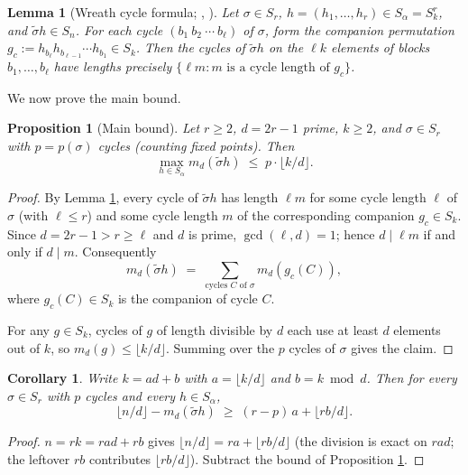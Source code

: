 \documentclass[11pt]{article}
\newtheorem{proposition}[theorem]{Proposition}
\newtheorem{corollary}[theorem]{Corollary}
\newtheorem{lemma}[theorem]{Lemma}
\theoremstyle{plain}
\theoremstyle{definition}
\theoremstyle{remark}
\begin{document}
\begin{lemma}[{Wreath cycle formula; \cite[Lem 4.5]{Clio-first-period},
\cite[Ch.~I App.~B]{Macdonald}}]
\label{lem:wreath}
Let $\sigma \in S_r$, $h = (h_1, \ldots, h_r) \in S_\alpha = S_k^r$, and
$\tilde\sigma h \in S_n$. For each cycle $(b_1\ b_2\ \cdots\ b_\ell)$ of
$\sigma$, form the companion permutation
$g_c := h_{b_\ell} h_{b_{\ell-1}} \cdots h_{b_1} \in S_k$. Then the cycles
of $\tilde\sigma h$ on the $\ell k$ elements of blocks $b_1, \ldots, b_\ell$
have lengths precisely $\{\ell m : m \text{ is a cycle length of } g_c\}$.
\end{lemma}

We now prove the main bound.

\begin{proposition}[Main bound]
\label{prop:bound}
Let $r \ge 2$, $d = 2r-1$ prime, $k \ge 2$, and $\sigma \in S_r$ with
$p = p(\sigma)$ cycles (counting fixed points). Then
\[
\max_{h \in S_\alpha} m_d(\tilde\sigma h) \;\le\; p \cdot \lfloor k/d\rfloor.
\]
\end{proposition}

\begin{proof}
By Lemma \ref{lem:wreath}, every cycle of $\tilde\sigma h$ has length
$\ell m$ for some cycle length $\ell$ of $\sigma$ (with $\ell \le r$) and
some cycle length $m$ of the corresponding companion $g_c \in S_k$.
Since $d = 2r - 1 > r \ge \ell$ and $d$ is prime, $\gcd(\ell, d) = 1$;
hence $d \mid \ell m$ if and only if $d \mid m$. Consequently
\[
m_d(\tilde\sigma h) \;=\; \sum_{\text{cycles $C$ of }\sigma} m_d(g_c(C)),
\]
where $g_c(C) \in S_k$ is the companion of cycle $C$.

For any $g \in S_k$, cycles of $g$ of length divisible by $d$ each use at
least $d$ elements out of $k$, so $m_d(g) \le \lfloor k/d\rfloor$. Summing
over the $p$ cycles of $\sigma$ gives the claim.
\end{proof}

\begin{corollary}
\label{cor:gap}
Write $k = ad + b$ with $a = \lfloor k/d\rfloor$ and $b = k \bmod d$.
Then for every $\sigma \in S_r$ with $p$ cycles and every $h \in S_\alpha$,
\[
\lfloor n/d\rfloor - m_d(\tilde\sigma h) \;\ge\; (r - p)\,a + \lfloor rb/d\rfloor.
\]
\end{corollary}

\begin{proof}
$n = rk = rad + rb$ gives $\lfloor n/d\rfloor = ra + \lfloor rb/d\rfloor$
(the division is exact on $rad$; the leftover $rb$ contributes
$\lfloor rb/d\rfloor$). Subtract the bound of Proposition \ref{prop:bound}.
\end{proof}
\end{document}
